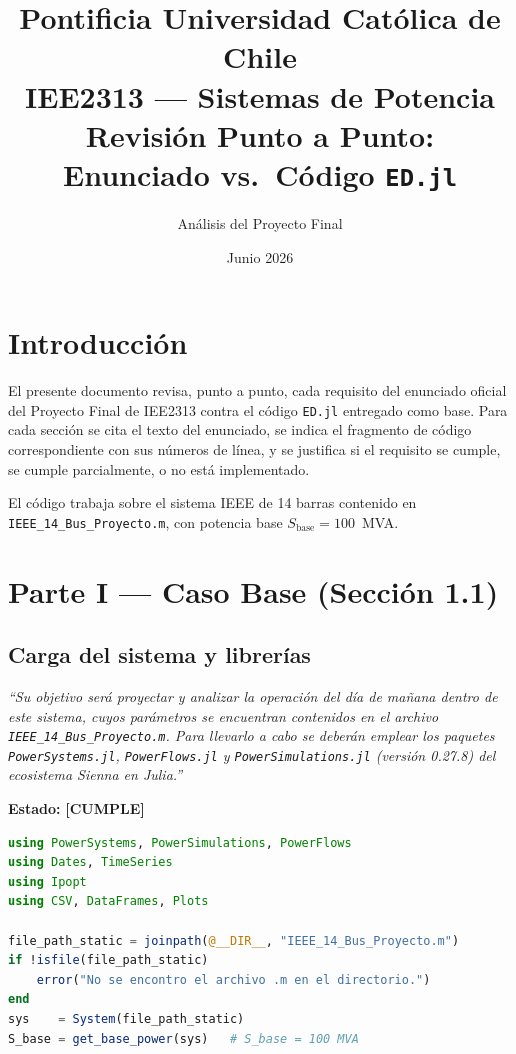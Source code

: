 \documentclass[12pt, a4paper]{article}
\title{
  \large Pontificia Universidad Católica de Chile \\
  \large IEE2313 --- Sistemas de Potencia \\[0.5em]
  \LARGE Revisión Punto a Punto: Enunciado vs.\ Código \texttt{ED.jl}
}
\author{Análisis del Proyecto Final}
\date{Junio 2026}
\newcommand{\cumple}{\textcolor{okgreen}{\textbf{[CUMPLE]}}}
\begin{document}
\maketitle
\tableofcontents
\newpage

\section{Introducción}

El presente documento revisa, punto a punto, cada requisito del enunciado oficial
del Proyecto Final de IEE2313 contra el código \texttt{ED.jl} entregado como base.
Para cada sección se cita el texto del enunciado, se indica el fragmento de código
correspondiente con sus números de línea, y se justifica si el requisito se cumple,
se cumple parcialmente, o no está implementado.

El código trabaja sobre el sistema IEEE de 14 barras contenido en
\texttt{IEEE\_14\_Bus\_Proyecto.m}, con potencia base $S_\text{base} = 100$~MVA.

\section{Parte I --- Caso Base (Sección 1.1)}

\subsection{Carga del sistema y librerías}

\begin{enunciadobox}
\textit{``Su objetivo será proyectar y analizar la operación del día de mañana dentro
de este sistema, cuyos parámetros se encuentran contenidos en el archivo
\texttt{IEEE\_14\_Bus\_Proyecto.m}. Para llevarlo a cabo se deberán emplear los paquetes
\texttt{PowerSystems.jl}, \texttt{PowerFlows.jl} y \texttt{PowerSimulations.jl}
(versión 0.27.8) del ecosistema Sienna en Julia.''}
\end{enunciadobox}

\textbf{Estado:} \cumple

\begin{lstlisting}[language=Julia, firstnumber=1,
  caption={Líneas 1--20: importación de paquetes y carga del sistema}]
using PowerSystems, PowerSimulations, PowerFlows
using Dates, TimeSeries
using Ipopt
using CSV, DataFrames, Plots

file_path_static = joinpath(@__DIR__, "IEEE_14_Bus_Proyecto.m")
if !isfile(file_path_static)
    error("No se encontro el archivo .m en el directorio.")
end
sys    = System(file_path_static)
S_base = get_base_power(sys)   # S_base = 100 MVA
\end{lstlisting}
\end{document}
